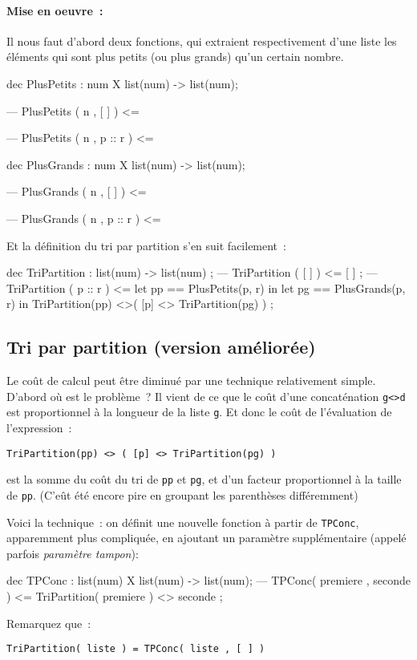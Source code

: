 \paragraph*{Mise en oeuvre~:} Il nous faut d'abord 
deux fonctions, qui extraient respectivement d'une liste les éléments
qui sont plus petits (ou plus grands) qu'un certain nombre.

\begin{verbatimtab}
dec PlusPetits : num X list(num) -> list(num);

--- PlusPetits ( n , [ ] ) <=

--- PlusPetits ( n , p :: r ) <=


dec PlusGrands : num X list(num) -> list(num);

--- PlusGrands ( n , [ ] ) <=

--- PlusGrands ( n , p :: r ) <=

\end{verbatimtab}

Et la définition du tri par partition s'en suit facilement~:

\begin{verbatimtab}
dec TriPartition : list(num) -> list(num) ;
--- TriPartition ( [ ] )    <= [ ]  ;
--- TriPartition ( p :: r ) <=  
              let pp == PlusPetits(p, r)
           in let pg == PlusGrands(p, r)
           in TriPartition(pp) <>( [p] <> TriPartition(pg) ) ;
\end{verbatimtab}

\subsection{Tri par partition (version améliorée)}

Le co\^ut de calcul peut \^etre diminué par une technique relativement
simple. D'abord o\`u est le problème~? Il vient de ce que le co\^ut
d'une concaténation \verb+g<>d+ est proportionnel à la longueur de la liste
\verb+g+. Et donc le co\^ut de l'évaluation de l'expression~:
\begin{verbatim}
TriPartition(pp) <> ( [p] <> TriPartition(pg) ) 
\end{verbatim}
est la somme du co\^ut
du tri de \verb+pp+ et \verb+pg+, et d'un facteur proportionnel à la taille de
\verb+pp+. (C'e\^ut été encore pire en groupant les parenthèses différemment)

Voici la technique~: on définit une nouvelle fonction à partir de 
\verb+TPConc+, apparemment plus compliquée, en ajoutant un paramètre  supplémentaire  (appelé parfois \emph{paramètre tampon}):
\begin{verbatimtab}
dec TPConc : list(num) X list(num) -> list(num);
--- TPConc( premiere , seconde ) <= TriPartition( premiere ) <> seconde ;
\end{verbatimtab}
Remarquez que~: 	
\begin{verbatim}
TriPartition( liste ) = TPConc( liste , [ ] ) 
\end{verbatim}


